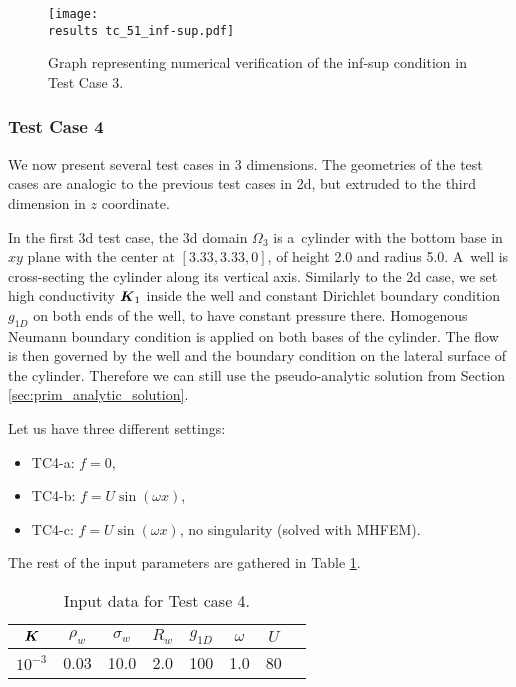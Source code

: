 %
\begin{figure}[!htb]
    \centering
    \texttt{[image: \\results tc\_51\_inf-sup.pdf]}
    \caption[numerical verification of inf-sup condition TC3]
    {Graph representing numerical verification of the inf-sup condition in Test Case 3.}
    \label{fig:mh_tc3_inf_sup}
\end{figure}
%

\subsubsection{Test Case 4}
We now present several test cases in 3 dimensions. The geometries of the test cases
are analogic to the previous test cases in 2d, but extruded to the third dimension in $z$ coordinate.

In the first 3d test case, the 3d domain $\Omega_3$ is a~cylinder with the bottom base in $xy$ plane
with the center at $[3.33,3.33,0]$, of height 2.0 and radius 5.0.
A~well is cross-secting the cylinder along its vertical axis.
Similarly to the 2d case, we set high conductivity $\mathbf{\boldsymbol{K}}_1$ inside the well and constant Dirichlet boundary condition $g_{1D}$ on both ends of the well,
to have constant pressure there.
Homogenous Neumann boundary condition is applied on both bases of the cylinder. The flow is then governed 
by the well and the boundary condition on the lateral surface of the cylinder.
Therefore we can still use the pseudo-analytic solution from Section \ref{sec:prim_analytic_solution}.

Let us have three different settings: 
\begin{itemize}
    \item TC4-a: $f=0$,
    \item TC4-b: $f=U\sin(\omega x)$,
    \item TC4-c: $f=U\sin(\omega x)$, no singularity (solved with MHFEM).
\end{itemize}
The rest of the input parameters are gathered in Table \ref{tab:tc4_data}.
%
\begin{table}[!htb]
\begin{center}
\begin{tabular}{cccccccc}
\toprule
$\mathbf{\boldsymbol{K}}$ & $\rho_w$ & $\sigma_w$ & $R_w$ & $g_{1D}$ & $\omega$ & $U$ \\
\midrule
$10^{-3}$ & 0.03 & 10.0 & 2.0 & 100 & 1.0 & 80\\
\bottomrule
\end{tabular}
\caption{Input data for Test case 4.}
\label{tab:tc4_data}
\end{center}
\end{table}


